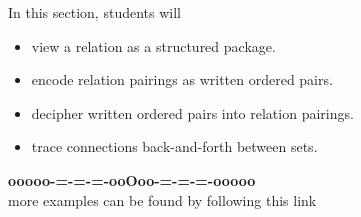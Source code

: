 \documentclass{ximera}
\begin{document}
\begin{sectionOutcomes}
In this section, students will 

\begin{itemize}
\item view a relation as a structured package.
\item encode relation pairings as written ordered pairs.
\item decipher written ordered pairs into relation pairings.
\item trace connections back-and-forth between sets.
\end{itemize}
\end{sectionOutcomes}






\begin{onlineOnly}
\begin{center}
\textbf{\textcolor{green!50!black}{ooooo-=-=-=-ooOoo-=-=-=-ooooo}} \\

more examples can be found by following this link\\ 

\end{center}
\end{onlineOnly}
\end{document}
